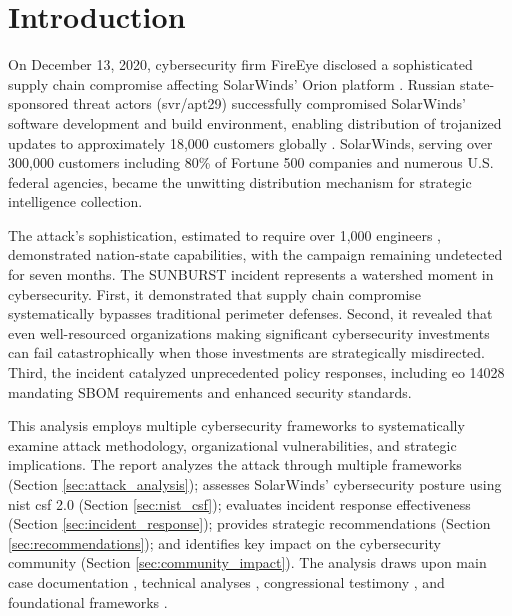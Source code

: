 \section{Introduction}

On December 13, 2020, cybersecurity firm FireEye disclosed a sophisticated supply chain compromise affecting SolarWinds' Orion platform \cite{fireeye_highly_2020}. Russian state-sponsored threat actors (\gls{svr}/\gls{apt}29) successfully compromised SolarWinds' software development and build environment, enabling distribution of trojanized updates to approximately 18,000 customers globally \cite{nagle_solarwinds_2023}. SolarWinds, serving over 300,000 customers including 80\% of Fortune 500 companies and numerous U.S. federal agencies, became the unwitting distribution mechanism for strategic intelligence collection.

The attack's sophistication, estimated to require over 1,000 engineers \cite{microsoft_analyzing_2020}, demonstrated nation-state capabilities, with the campaign remaining undetected for seven months. The SUNBURST incident represents a watershed moment in cybersecurity. First, it demonstrated that supply chain compromise systematically bypasses traditional perimeter defenses. Second, it revealed that even well-resourced organizations making significant cybersecurity investments can fail catastrophically when those investments are strategically misdirected. Third, the incident catalyzed unprecedented policy responses, including \gls{eo} 14028 \cite{biden2021} mandating SBOM requirements and enhanced security standards.

This analysis employs multiple cybersecurity frameworks to systematically examine attack methodology, organizational vulnerabilities, and strategic implications. The report analyzes the attack through multiple frameworks (Section \ref{sec:attack_analysis}); assesses SolarWinds' cybersecurity posture using \gls{nist} \gls{csf} 2.0 (Section \ref{sec:nist_csf}); evaluates incident response effectiveness (Section \ref{sec:incident_response}); provides strategic recommendations (Section \ref{sec:recommendations}); and identifies key impact on the cybersecurity community (Section \ref{sec:community_impact}). The analysis draws upon main case documentation \cite{nagle_solarwinds_2023}, technical analyses \cite{eckels_sunburst_2020, fireeye_highly_2020, microsoft_analyzing_2020}, congressional testimony \cite{us_open_2021}, and foundational frameworks \cite{boyens_cybersecurity_2024, nelson_incident_2025, pascoe_nist_2024, rose_zero_2020, strom_mitre_2018}.
